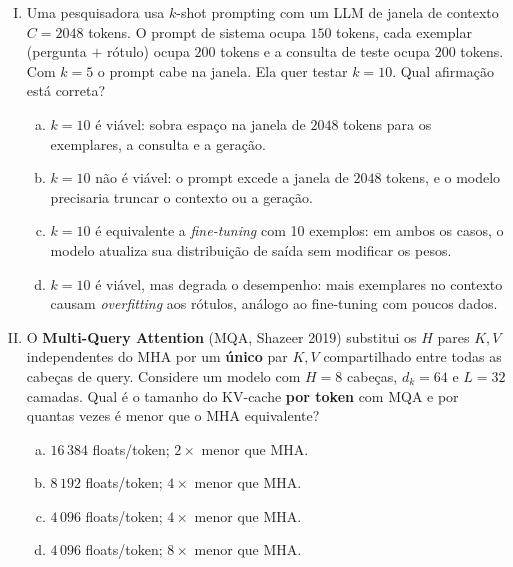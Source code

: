 \documentclass{dlproblemset}
\begin{document}
\begin{enumerate}[I)]
\item Uma pesquisadora usa $k$-shot prompting com um LLM de janela de
      contexto $C = 2048$ tokens. O prompt de sistema ocupa $150$ tokens,
      cada exemplar (pergunta $+$ rótulo) ocupa $200$ tokens e a consulta
      de teste ocupa $200$ tokens. Com $k = 5$ o prompt cabe na janela.
      Ela quer testar $k = 10$. Qual afirmação está correta?

\begin{enumerate}[a)]
    \item $k = 10$ é viável: sobra espaço na janela de $2048$ tokens
          para os exemplares, a consulta e a geração.
    \item $k = 10$ não é viável: o prompt excede a janela de $2048$
          tokens, e o modelo precisaria truncar o contexto ou a geração.
    \item $k = 10$ é equivalente a \textit{fine-tuning} com 10 exemplos:
          em ambos os casos, o modelo atualiza sua distribuição de saída
          sem modificar os pesos.
    \item $k = 10$ é viável, mas degrada o desempenho: mais exemplares no
          contexto causam \textit{overfitting} aos rótulos, análogo ao
          fine-tuning com poucos dados.
\end{enumerate}

\item O \textbf{Multi-Query Attention} (MQA, Shazeer 2019) substitui os
      $H$ pares $K,V$ independentes do MHA por um \textbf{único} par $K,V$
      compartilhado entre todas as cabeças de query.
      Considere um modelo com $H = 8$ cabeças, $d_k = 64$ e $L = 32$ camadas.
      Qual é o tamanho do KV-cache \textbf{por token} com MQA e por quantas
      vezes é menor que o MHA equivalente?

\begin{enumerate}[a)]
    \item $16\,384$ floats/token; $2\times$ menor que MHA.
    \item $8\,192$ floats/token; $4\times$ menor que MHA.
    \item $4\,096$ floats/token; $4\times$ menor que MHA.
    \item $4\,096$ floats/token; $8\times$ menor que MHA.
\end{enumerate}


\end{enumerate}
\end{document}
